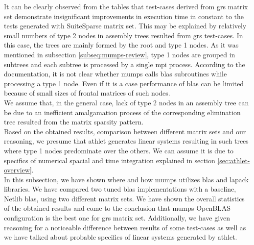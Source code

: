 It can be clearly observed from the tables that test-cases derived from \gls{grs} matrix set demonstrate insignificant improvements in execution time in constant to the tests generated with SuiteSparse matrix set. This may be explained by relatively small numbers of type 2 nodes in assembly trees resulted from \gls{grs} test-cases. In this case, the trees are mainly formed by the root and type 1 nodes. As it was mentioned in subsection \ref{subseq:mumps-review}, type 1 nodes are grouped in subtrees and each subtree is processed by a single \gls{mpi} process. According to the documentation, it is not clear whether \gls{mumps} calls \gls{blas} subroutines while processing a type 1 node. Even if it is a case performance of \gls{blas} can be limited because of small sizes of frontal matrices of such nodes.\\

We assume that, in the general case, lack of type 2 nodes in an assembly tree can be due to an inefficient amalgamation process of the corresponding elimination tree resulted from the matrix sparsity pattern.\\


Based on the obtained results, comparison between different matrix sets and our reasoning, we presume that \gls{athlet} generates linear systems resulting in such trees where type 1 nodes predominate over the others. We can assume it is due to specifics of numerical spacial and time integration explained in section \ref{sec:athlet-overview}.\\


In this subsection, we have shown where and how \gls{mumps} utilizes \gls{blas} and \gls{lapack} libraries. We have compared two tuned \gls{blas} implementations with a baseline, Netlib \gls{blas}, using two different matrix sets. We have shown the overall statistics of the obtained results and come to the conclusion that \gls{mumps}-OpenBLAS configuration is the best one for \gls{grs} matrix set. Additionally, we have given reasoning for a noticeable difference between results of some test-cases as well as we have talked about probable specifics of linear systems generated by \gls{athlet}.\\
